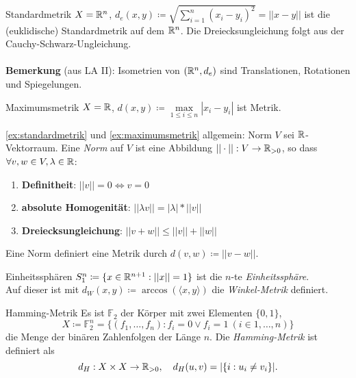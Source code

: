 \begin{example}{Standardmetrik}
  \label{ex:standardmetrik}
  $ X = \mathbb{R}^n $, $ d_e(x, y) \coloneqq \sqrt{\sum_{i=1}^n(x_i-y_i)^2} = ||x-y|| $ ist die (euklidische) Standardmetrik auf dem $ \mathbb{R}^n $. Die Dreiecksungleichung folgt aus der Cauchy-Schwarz-Ungleichung. \\ \ \\
  \textbf{Bemerkung} (aus LA II): Isometrien von $ (\mathbb{R}^n, d_e) $ sind Translationen, Rotationen und Spiegelungen.
\end{example}

\begin{example}{Maximumsmetrik}
  \label{ex:maximumsmetrik}
  $ X = \mathbb{R} $, $ d(x, y) \coloneqq \underset{1 \leq i \leq n}{\max} |x_i-y_i| $ ist Metrik.
\end{example}

\begin{example}{\autoref{ex:standardmetrik} und \autoref{ex:maximumsmetrik} allgemein: Norm}
  $ V $ sei $ \mathbb{R} $-Vektorraum. Eine \emph{Norm} auf $ V $ ist eine Abbildung $ ||\cdot|| : V \to \mathbb{R}_{>0} $, so dass $ \forall v, w \in V, \lambda \in \mathbb{R} $:
  \begin{enumerate}
    \item \textbf{Definitheit}: $ ||v|| = 0 \Leftrightarrow v = 0 $
    \item \textbf{absolute Homogenität}: $ ||\lambda v|| = |\lambda| * ||v|| $
    \item \textbf{Dreiecksungleichung}: $ ||v+w|| \leq ||v||+||w|| $
  \end{enumerate}
  Eine Norm definiert eine Metrik durch $ d(v, w) \coloneqq ||v-w|| $.
\end{example}

\begin{example}{Einheitssphären}
  $ S_1^n \coloneqq \{ x \in \mathbb{R}^{n+1} : ||x|| = 1 \} $  ist die $ n $-te \emph{Einheitssphäre}. \\
  Auf dieser ist mit $ d_W(x, y) \coloneqq \arccos(\langle x, y \rangle) $ die \emph{Winkel-Metrik} definiert.
\end{example}

\begin{example}{Hamming-Metrik}
  Es ist $ \mathbb{F}_2 $ der Körper mit zwei Elementen $ \{ 0, 1 \} $,
  \begin{equation*}
    X \coloneqq \mathbb{F}_2^n = \{ (f_1, \dots, f_n) : f_i = 0 \vee f_i = 1 \ (i \in {1, \dots, n}) \}
  \end{equation*}
  die Menge der binären Zahlenfolgen der Länge $ n $. Die \emph{Hamming-Metrik} ist definiert als
  \begin{equation*}
    d_H: X \times X \to \mathbb{R}_{>0}, \quad d_H(u,v) = |\{ i : u_i \neq v_i \}|\text{.}
  \end{equation*}
\end{example}